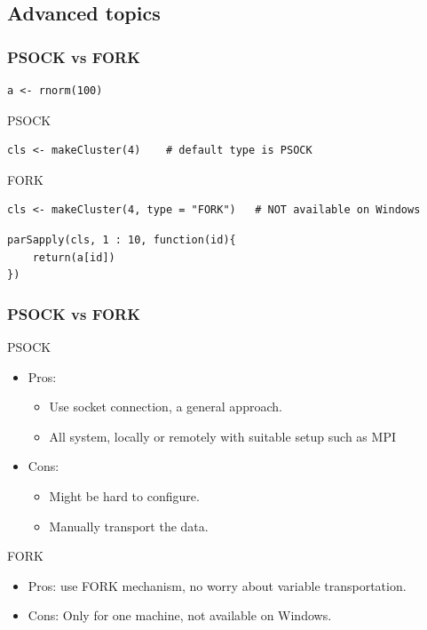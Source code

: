 \documentclass[aspectratio=169,xcolor={dvipsnames,table}]{beamer}
\begin{document}
\subsection{Advanced topics}

\begin{frame}[fragile]
  \frametitle{PSOCK vs FORK}
\begin{verbatim}
a <- rnorm(100)
\end{verbatim}
  \begin{block}{PSOCK}
\begin{verbatim}
cls <- makeCluster(4)    # default type is PSOCK
\end{verbatim}
  \end{block}
  \begin{block}{FORK}
\begin{verbatim}
cls <- makeCluster(4, type = "FORK")   # NOT available on Windows
\end{verbatim}
  \end{block}
\begin{verbatim}
parSapply(cls, 1 : 10, function(id){
    return(a[id])    
})
\end{verbatim}
\end{frame}

\begin{frame}
  \frametitle{PSOCK vs FORK}
  \begin{block}{PSOCK}
    \begin{itemize}
    \item Pros:
      \begin{itemize}
      \item Use socket connection, a general approach.
      \item All system, locally or remotely with suitable setup such as MPI
      \end{itemize}
    \item Cons:
      \begin{itemize}
      \item Might be hard to configure.
      \item Manually transport the data.
      \end{itemize}
    \end{itemize}
  \end{block}
  \begin{block}{FORK}
    \begin{itemize}
    \item Pros: use FORK mechanism, no worry about variable transportation.
    \item Cons: Only for one machine, not available on Windows.
    \end{itemize}
  \end{block}
\end{frame}
\end{document}
